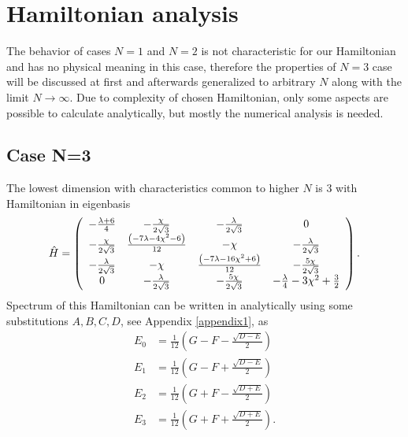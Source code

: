 \section{Hamiltonian analysis}
The behavior of cases $N=1$ and $N=2$ is not characteristic for our Hamiltonian and has no physical meaning in this case, therefore the properties of $N=3$ case will be discussed at first and afterwards generalized to arbitrary $N$ along with the limit $N\rightarrow\infty$. Due to complexity of chosen Hamiltonian, only some aspects are possible to calculate analytically, but mostly the numerical analysis is needed.



\subsection{Case N=3}
The lowest dimension with characteristics common to higher $N$ is 3 with Hamiltonian in eigenbasis
\begin{equation}
    \hat{H}=\left(
        \begin{array}{cccc}
         -\frac{ \lambda +6}{4} & -\frac{\chi }{2 \sqrt{3}} & -\frac{\lambda }{2 \sqrt{3}} & 0 \\
         -\frac{\chi }{2 \sqrt{3}} & \frac{ \left(-7 \lambda -4 \chi ^2-6\right)}{12} & -\chi  & -\frac{\lambda }{2 \sqrt{3}} \\
         -\frac{\lambda }{2 \sqrt{3}} & -\chi  & \frac{ \left(-7 \lambda -16 \chi ^2+6\right)}{12} & -\frac{5 \chi }{2 \sqrt{3}} \\
         0 & -\frac{\lambda }{2 \sqrt{3}} & -\frac{5 \chi }{2 \sqrt{3}} & -\frac{\lambda }{4}-3 \chi ^2+\frac{3}{2} \\
        \end{array}
        \right).
\end{equation}
Spectrum of this Hamiltonian can be written in analytically using some substitutions $A,B,C,D$, see Appendix \ref{appendix1}, as
\begin{align}
        E_0 &= \frac{1}{12} \left(G-F-\frac{\sqrt{D-E}}{2}\right)
        \label{eq:N=3_en0}\\
        E_1 &= \frac{1}{12}  \left(G-F+\frac{\sqrt{D-E}}{2}\right)
        \label{eq:N=3_en1}\\
        E_2 &= \frac{1}{12} \left(G+F-\frac{\sqrt{D+E}}{2}\right)
        \label{eq:N=3_en2}\\
        E_3 &= \frac{1}{12}  \left(G+F+\frac{\sqrt{D+E}}{2}\right).
        \label{eq:N=3_en3}
\end{align}
